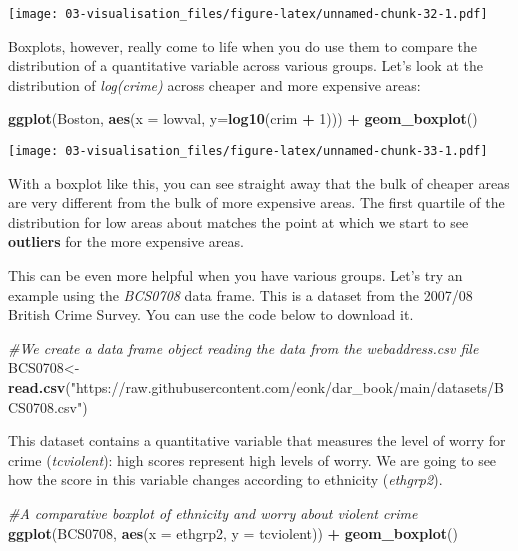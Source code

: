 \documentclass[
]{book}
\newenvironment{Shaded}{\begin{snugshade}}{\end{snugshade}}
\newcommand{\AttributeTok}[1]{\textcolor[rgb]{0.13,0.29,0.53}{#1}}
\newcommand{\CommentTok}[1]{\textcolor[rgb]{0.56,0.35,0.01}{\textit{#1}}}
\newcommand{\DecValTok}[1]{\textcolor[rgb]{0.00,0.00,0.81}{#1}}
\newcommand{\FunctionTok}[1]{\textcolor[rgb]{0.13,0.29,0.53}{\textbf{#1}}}
\newcommand{\NormalTok}[1]{#1}
\newcommand{\OtherTok}[1]{\textcolor[rgb]{0.56,0.35,0.01}{#1}}
\newcommand{\SpecialCharTok}[1]{\textcolor[rgb]{0.81,0.36,0.00}{\textbf{#1}}}
\newcommand{\StringTok}[1]{\textcolor[rgb]{0.31,0.60,0.02}{#1}}
\begin{document}
\texttt{[image: 03-visualisation\_files/figure-latex/unnamed-chunk-32-1.pdf]}

Boxplots, however, really come to life when you do use them to compare the distribution of a quantitative variable across various groups. Let's look at the distribution of \emph{log(crime)} across cheaper and more expensive areas:

\begin{Shaded}
\begin{Highlighting}[]
\FunctionTok{ggplot}\NormalTok{(Boston, }\FunctionTok{aes}\NormalTok{(}\AttributeTok{x =}\NormalTok{ lowval, }\AttributeTok{y=}\FunctionTok{log10}\NormalTok{(crim }\SpecialCharTok{+} \DecValTok{1}\NormalTok{))) }\SpecialCharTok{+}
  \FunctionTok{geom\_boxplot}\NormalTok{()}
\end{Highlighting}
\end{Shaded}

\texttt{[image: 03-visualisation\_files/figure-latex/unnamed-chunk-33-1.pdf]}

With a boxplot like this, you can see straight away that the bulk of cheaper areas are very different from the bulk of more expensive areas. The first quartile of the distribution for low areas about matches the point at which we start to see \textbf{outliers} for the more expensive areas.

This can be even more helpful when you have various groups. Let's try an example using the \emph{BCS0708} data frame. This is a dataset from the 2007/08 British Crime Survey. You can use the code below to download it.

\begin{Shaded}
\begin{Highlighting}[]
\CommentTok{\#We create a data frame object reading the data from the webaddress.csv file}
\NormalTok{BCS0708}\OtherTok{\textless{}{-}}\FunctionTok{read.csv}\NormalTok{(}\StringTok{"https://raw.githubusercontent.com/eonk/dar\_book/main/datasets/BCS0708.csv"}\NormalTok{)}
\end{Highlighting}
\end{Shaded}

This dataset contains a quantitative variable that measures the level of worry for crime (\emph{tcviolent}): high scores represent high levels of worry. We are going to see how the score in this variable changes according to ethnicity (\emph{ethgrp2}).

\begin{Shaded}
\begin{Highlighting}[]
\CommentTok{\#A comparative boxplot of ethnicity and worry about violent crime}
\FunctionTok{ggplot}\NormalTok{(BCS0708, }\FunctionTok{aes}\NormalTok{(}\AttributeTok{x =}\NormalTok{ ethgrp2, }\AttributeTok{y =}\NormalTok{ tcviolent)) }\SpecialCharTok{+}
  \FunctionTok{geom\_boxplot}\NormalTok{()}
\end{Highlighting}
\end{Shaded}
\end{document}
